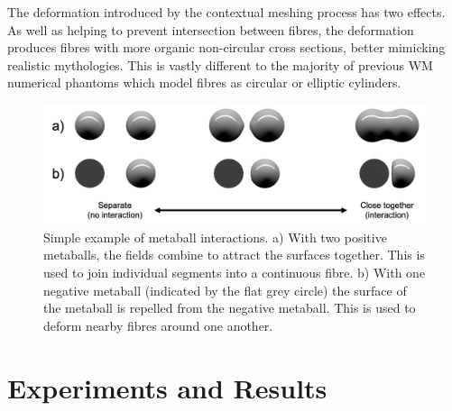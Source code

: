 The deformation introduced by the contextual meshing process has two effects.
As well as helping to prevent intersection between fibres, the deformation produces fibres with more organic non-circular cross sections, better mimicking realistic mythologies.
This is vastly different to the majority of previous WM numerical phantoms which model fibres as circular or elliptic cylinders.


\begin{figure}
  \centering
  \includegraphics[width=\textwidth]{figures/config/metaballs.png}
  \caption{\small Simple example of metaball interactions. a) With two positive metaballs, the fields combine to attract the surfaces together. This is used to join individual segments into a continuous fibre. b) With one negative metaball (indicated by the flat grey circle) the surface of the metaball is repelled from the negative metaball. This is used to deform nearby fibres around one another.}
  \label{fig:metaballs}
\end{figure}



\section{Experiments and Results}
\label{sec:experiments_and_results}

